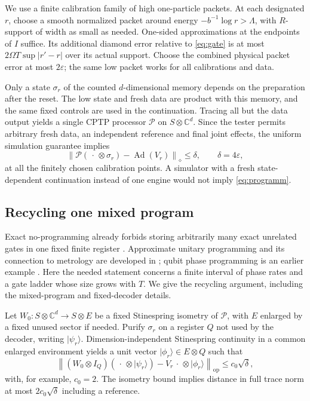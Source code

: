 \documentclass[11pt]{article}
\theoremstyle{remark}
\newcommand{\Ad}{\operatorname{Ad}}
\newcommand{\norm}[1]{\left\lVert #1\right\rVert}
\newcommand{\ket}[1]{\lvert #1\rangle}
\begin{document}
We use a finite calibration family of high one-particle packets.
At each designated \(r\), choose a smooth normalized packet around
energy \(-b^{-1}\log r>\Lambda\), with \(R\)-support of width as small
as needed. One-sided approximations at the endpoints of \(I\)
suffice. Its additional diamond error relative to \eqref{eq:gate}
is at most \(2\Omega T\sup |r'-r|\) over its actual support.
Choose the combined physical packet error at most \(2\varepsilon\);
the same low packet works for all calibrations and data.

Only a state \(\sigma_r\) of the counted \(d\)-dimensional memory
depends on the preparation after the reset. The low state and
fresh data are product with this memory, and the same fixed controls
are used in the continuation. Tracing all but the data output yields
a single CPTP processor \(\mathcal P\) on \(S\otimes\mathbb C^d\).
Since the tester permits arbitrary fresh data, an independent
reference and final joint effects, the uniform simulation guarantee
implies
\begin{equation}\label{eq:programm}
 \norm{\mathcal P(\,\cdot\,\otimes\sigma_r)-\Ad(V_r)}_\diamond
 \le\delta,\qquad \delta=4\varepsilon ,
\end{equation}
at all the finitely chosen calibration points. A simulator with a
fresh state-dependent continuation instead of one engine would not
imply \eqref{eq:programm}.

\subsection{Recycling one mixed program}\label{sec:recycle}

Exact no-programming already forbids storing arbitrarily many exact
unrelated gates in one fixed finite register \cite{NC}. Approximate
unitary programming and its connection to metrology are developed
in \cite{YRC}; qubit phase programming is an earlier example
\cite{VMC,ZB}. Here the needed statement concerns a finite interval
of phase rates and a gate ladder whose size grows with \(T\).
We give the recycling argument, including the mixed-program
and fixed-decoder details.

Let \(W_0:S\otimes\mathbb C^d\longrightarrow S\otimes E\) be a
fixed Stinespring isometry of \(\mathcal P\), with \(E\) enlarged
by a fixed unused sector if needed. Purify \(\sigma_r\) on a
register \(Q\) not used by the decoder, writing \(\ket{\psi_r}\).
Dimension-independent Stinespring continuity \cite{KSW}
in a common enlarged environment yields a unit vector
\(\ket{\phi_r}\in E\otimes Q\) such that
\begin{equation}\label{eq:ksw}
 \norm{(W_0\otimes I_Q)(\,\cdot\,\otimes\ket{\psi_r})
                 -V_r\,\cdot\,\otimes\ket{\phi_r}}_{\mathrm{op}}
 \le c_0\sqrt{\delta},
\end{equation}
with, for example, \(c_0=2\). The isometry bound implies distance in
full trace norm at most \(2c_0\sqrt\delta\) including a reference.
\end{document}
